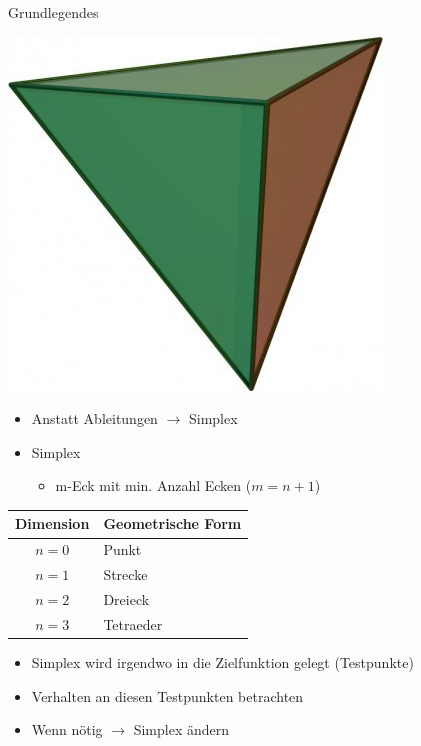 \documentclass[\outputformat]{beamer}
\begin{document}
\begin{frame}{Grundlegendes}
	\begin{minipage}[m]{4cm}
		\includegraphics[height=0.3\paperheight]{tetraeder.jpg}
	\end{minipage}
	\begin{minipage}[m]{7cm}
		\begin{itemize}
			\item Anstatt Ableitungen $\rightarrow$ Simplex
			\item Simplex
				\begin{itemize}
					\item m-Eck mit min. Anzahl Ecken ($m=n+1$)\\
				\end{itemize}
		\end{itemize}
		\begin{tabular}{c|l}
		Dimension & Geometrische Form\\
		\hline
		$n=0$ & Punkt\\
		$n=1$ & Strecke\\
		$n=2$ & Dreieck\\
		$n=3$ & Tetraeder
		\end{tabular} 
		\begin{itemize}
			\pause\item Simplex wird irgendwo in die Zielfunktion gelegt (Testpunkte)
			\pause\item Verhalten an diesen Testpunkten betrachten
			\pause\item Wenn nötig $\rightarrow$ Simplex ändern
		\end{itemize}
	\end{minipage}
\end{frame}
\end{document}
